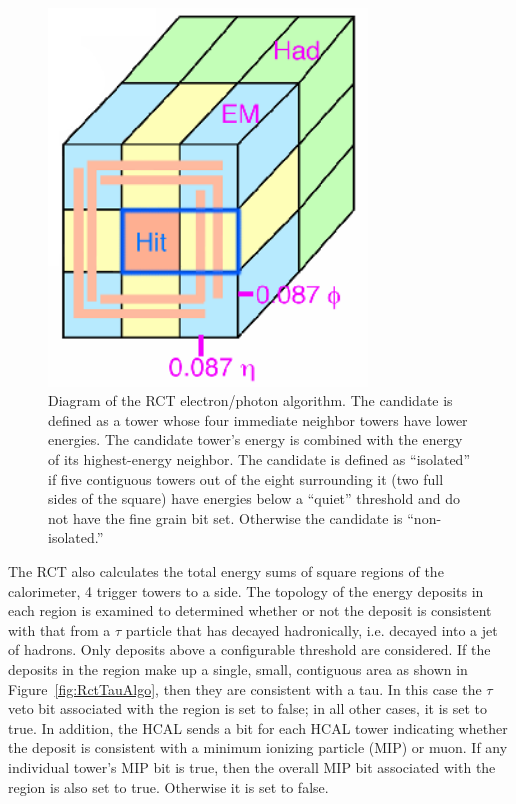 \begin{figure}[htb]
  \begin{center}
    \includegraphics[width=240pt]{Figures/RCT-EG-algo.png} 
  \end{center}
  \caption[\fixspacing Diagram of the RCT electron/photon algorithm]{
    \fixspacing Diagram of the RCT electron/photon algorithm. 
    The candidate is defined as a tower whose four 
    immediate neighbor towers have lower energies.  
    The candidate tower's energy is combined with 
    the energy of its highest-energy neighbor.  
    The candidate is defined as ``isolated'' if 
    five contiguous towers out of the eight 
    surrounding it (two full sides of the square) 
    have energies below a ``quiet'' threshold 
    and do not have the fine grain bit set.  
    Otherwise the candidate is ``non-isolated.''  
  }
  \label{fig:RctEgAlgo}
 \end{figure}

The RCT also calculates the total energy sums 
of square regions of the calorimeter, 
4 trigger towers to a side.  
The topology of the energy deposits in each region 
is examined to determined whether or not the 
deposit is consistent with that from 
a $\tau$ particle that has decayed hadronically, 
i.e. decayed into a jet of hadrons.  
Only deposits above a configurable threshold 
are considered.  
If the deposits in the region make up a 
single, small, contiguous area as shown in 
Figure~\ref{fig:RctTauAlgo},
then they are consistent with a tau.  
In this case the $\tau$ veto bit associated 
with the region is set to false; 
in all other cases, it is set to true.  
In addition, the HCAL sends a bit for each 
HCAL tower indicating whether the deposit 
is consistent with a minimum ionizing particle 
(MIP) or muon.  
If any individual tower's MIP bit is true, 
then the overall MIP bit associated with the region 
is also set to true.  
Otherwise it is set to false.  

